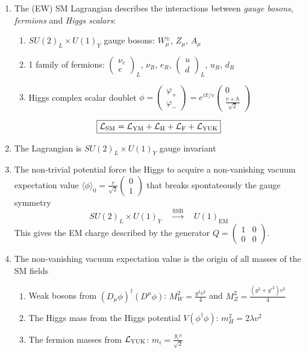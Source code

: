 \documentclass[TheoreticalPhy_ModB.tex]{subfiles}
\begin{document}
\begin{enumerate}[label=(\arabic*)]
\item The (EW) SM Lagrangian describes the interactions between \emph{gauge bosons}, \emph{fermions} and \emph{Higgs scalars}:
\begin{enumerate}
\item $SU(2)_L\times U(1)_Y$ gauge bosons: $W_\mu^\pm$, $Z_\mu$, $A_\mu$
\item 1 family of fermions: $\begin{pmatrix}\nu_e\\e\end{pmatrix}_L$, $\nu_R$, $e_R$, $\begin{pmatrix}u\\d\end{pmatrix}_L$, $u_R$, $d_R$
\item Higgs complex scalar doublet $\phi=\begin{pmatrix}\varphi_+\\\varphi_-\end{pmatrix}=e^{i\hat\pi/v}\begin{pmatrix}0\\\frac{v+h}{\sqrt2}\end{pmatrix}$
\end{enumerate}
\[\boxed{\mathcal L_{\text{SM}}=\mathcal L_{\text{YM}}+\mathcal L_{\text{H}}+\mathcal L_{\text{F}}+\mathcal L_{\text{YUK}}}\]

\item The Lagrangian is $SU(2)_L\times U(1)_Y$ gauge invariant

\item The non-trivial potential force the Higgs to acquire a non-vanishing vacuum expectation value $\langle\phi\rangle_0=\frac{v}{\sqrt2}\begin{pmatrix}0\\1\end{pmatrix}$ that breaks spontateously the gauge symmetry
\[SU(2)_L\times U(1)_Y\quad\overset{\text{SSB}}{\longrightarrow}\quad U(1)_{\text{EM}}\]
This gives the EM charge described by the generator $Q=\begin{pmatrix}1&0\\0&0\end{pmatrix}$. 

\item The non-vanishing vacuum expectation value is the origin of all masses of the SM fields
\begin{enumerate}
\item Weak bosons from $(D_\mu\phi)^\dagger(D^\mu\phi)$: $M_W^2=\frac{g^2v^2}4$ and $M_Z^2=\frac{(g^2+g'^2)v^2}4$
\item The Higgs mass from the Higgs potential $V(\phi^\dagger\phi)$: $m_H^2=2\lambda v^2$
\item The fermion masses from $\mathcal L_{\text{YUK}}$: $m_i=\frac{y_iv}{\sqrt2}$
\end{enumerate}

\end{enumerate}
\end{document}

